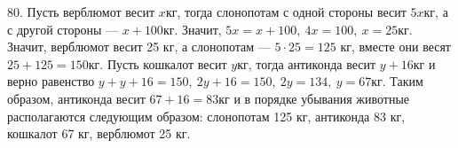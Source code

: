 80. Пусть верблюмот весит $x$кг, тогда слонопотам с одной стороны весит $5x$кг, а с другой стороны --- $x+100$кг. Значит, $5x=x+100,\ 4x=100,\ x=25$кг. Значит, верблюмот весит 25 кг, а слонопотам --- $5\cdot25=125$ кг, вместе они весят $25+125=150$кг. Пусть кошкалот весит $y$кг, тогда антиконда весит $y+16$кг и верно равенство $y+y+16=150,\ 2y+16=150,\ 2y=134,\ y=67$кг. Таким образом, антиконда весит $67+16=83$кг и в порядке убывания животные располагаются следующим образом: слонопотам 125 кг, антиконда 83 кг, кошкалот 67 кг, верблюмот 25 кг.\\
